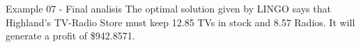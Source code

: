 \begin{frame}{Example 07 - Final analisis}
The optimal solution given by LINGO says that Highland's TV-Radio Store
must keep 12.85 TVs in stock and 8.57 Radios. It will generate a profit of \$942.8571.


\end{frame}
